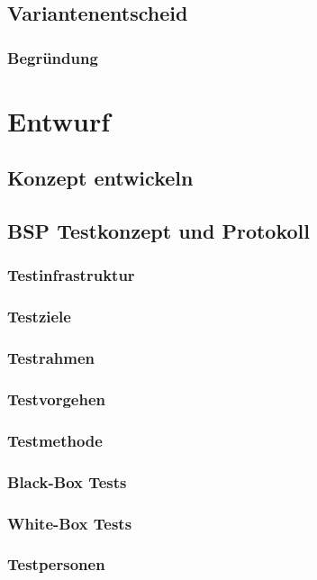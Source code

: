 \documentclass{report}
\begin{document}
\section{Variantenentscheid}
\subsection{Begründung}

\chapter{Entwurf}
\section{Konzept entwickeln}
\section{BSP Testkonzept und Protokoll}
\subsection{Testinfrastruktur}
\subsection{Testziele}
\subsection{Testrahmen}
\subsection{Testvorgehen}
\subsection{Testmethode}
\subsection{Black-Box Tests}
\subsection{White-Box Tests}
\subsection{Testpersonen}
\end{document}
